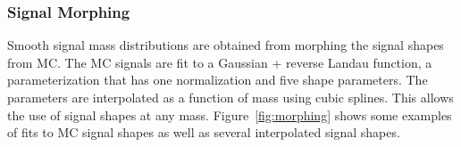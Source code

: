 %
%

\clearpage
\subsubsection{Signal Morphing}
\label{sec:SwiftMorphing}


Smooth signal mass distributions are obtained  from morphing the signal shapes from MC. The MC signals are fit to a Gaussian + reverse Landau function, a parameterization that has one normalization and five shape parameters. The parameters are interpolated as a function of mass using cubic splines. This allows the use of signal shapes at any mass. Figure~\ref{fig:morphing} shows some examples of fits to MC signal shapes as well as several interpolated signal shapes.  

